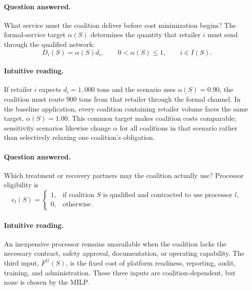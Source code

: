 \paragraph{Question answered.}
What service must the coalition deliver before cost minimization begins? The formal-service target $\alpha(S)$ determines the quantity that retailer $i$ must send through the qualified network:
\begin{equation}
\label{eq:ch4_required_volume}
D_i(S)=\alpha(S)d_i,
\qquad 0<\alpha(S)\leq 1,
\qquad i\in I(S).
\end{equation}
\paragraph{Intuitive reading.}
If retailer $i$ expects $d_i=1{,}000$ tons and the scenario uses $\alpha(S)=0.90$, the coalition must route 900 tons from that retailer through the formal channel. In the baseline application, every coalition containing retailer volume faces the same target, $\alpha(S)=1.00$. This common target makes coalition costs comparable; sensitivity scenarios likewise change $\alpha$ for all coalitions in that scenario rather than selectively relaxing one coalition's obligation.

\paragraph{Question answered.}
Which treatment or recovery partners may the coalition actually use? Processor eligibility is
\begin{equation}
\label{eq:ch4_processor_eligibility}
e_l(S)=
\begin{cases}
1, & \text{if coalition $S$ is qualified and contracted to use processor $l$},\\
0, & \text{otherwise.}
\end{cases}
\end{equation}
\paragraph{Intuitive reading.}
An inexpensive processor remains unavailable when the coalition lacks the necessary contract, safety approval, documentation, or operating capability. The third input, $F^G(S)$, is the fixed cost of platform readiness, reporting, audit, training, and administration. These three inputs are coalition-dependent, but none is chosen by the MILP.

